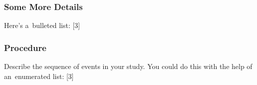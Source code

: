 \subsubsection{Some More Details}
\blindtext

Here's a~bulleted list:
[3]
 
\subsubsection{Procedure}
\label{sec:Procedure}
Describe the sequence of events in your study. You could do this with the help of an~enumerated list:
[3]